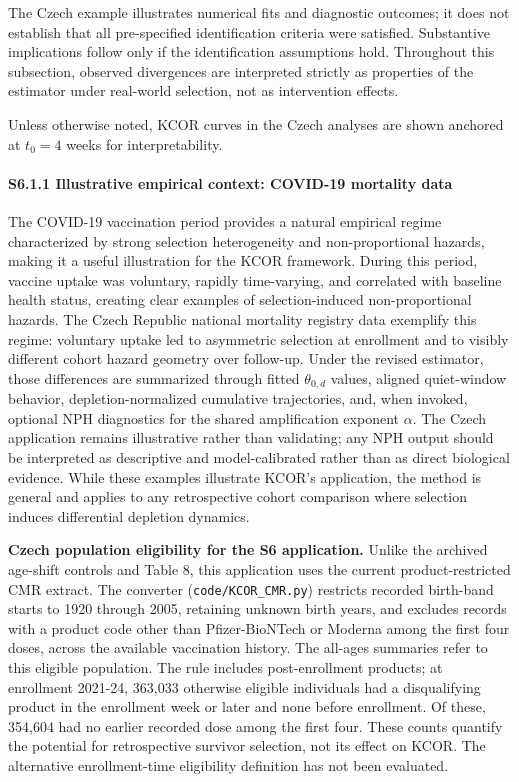 \documentclass[
]{article}
\newcounter{none} %
\begin{document}
The Czech example illustrates numerical fits and diagnostic outcomes; it does not establish that all pre-specified identification criteria were satisfied. Substantive implications follow only if the identification assumptions hold. Throughout this subsection, observed divergences are interpreted strictly as properties of the estimator under real-world selection, not as intervention effects.

Unless otherwise noted, KCOR curves in the Czech analyses are shown anchored at \(t_0 = 4\) weeks for interpretability.

\paragraph{S6.1.1 Illustrative empirical context: COVID-19 mortality data}\label{s6.1.1-illustrative-empirical-context-covid-19-mortality-data}

The COVID-19 vaccination period provides a natural empirical regime characterized by strong selection heterogeneity and non-proportional hazards, making it a useful illustration for the KCOR framework. During this period, vaccine uptake was voluntary, rapidly time-varying, and correlated with baseline health status, creating clear examples of selection-induced non-proportional hazards. The Czech Republic national mortality registry data exemplify this regime: voluntary uptake led to asymmetric selection at enrollment and to visibly different cohort hazard geometry over follow-up. Under the revised estimator, those differences are summarized through fitted \(\theta_{0,d}\) values, aligned quiet-window behavior, depletion-normalized cumulative trajectories, and, when invoked, optional NPH diagnostics for the shared amplification exponent \(\alpha\). The Czech application remains illustrative rather than validating; any NPH output should be interpreted as descriptive and model-calibrated rather than as direct biological evidence. While these examples illustrate KCOR's application, the method is general and applies to any retrospective cohort comparison where selection induces differential depletion dynamics.

\textbf{Czech population eligibility for the S6 application.} Unlike the archived age-shift controls and Table 8, this application uses the current product-restricted CMR extract. The converter (\texttt{code/KCOR\_CMR.py}) restricts recorded birth-band starts to 1920 through 2005, retaining unknown birth years, and excludes records with a product code other than Pfizer-BioNTech or Moderna among the first four doses, across the available vaccination history. The all-ages summaries refer to this eligible population. The rule includes post-enrollment products; at enrollment 2021-24, 363,033 otherwise eligible individuals had a disqualifying product in the enrollment week or later and none before enrollment. Of these, 354,604 had no earlier recorded dose among the first four. These counts quantify the potential for retrospective survivor selection, not its effect on KCOR. The alternative enrollment-time eligibility definition has not been evaluated.
\end{document}
